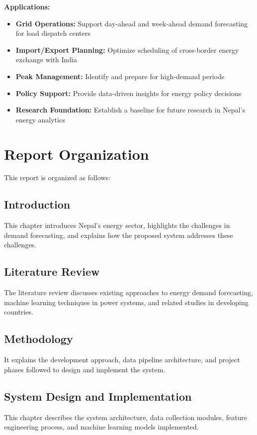         \textbf{Applications:}
        \begin{itemize}
            \item \textbf{Grid Operations:} Support day-ahead and week-ahead demand forecasting for load dispatch centers
            \item \textbf{Import/Export Planning:} Optimize scheduling of cross-border energy exchange with India
            \item \textbf{Peak Management:} Identify and prepare for high-demand periods
            \item \textbf{Policy Support:} Provide data-driven insights for energy policy decisions
            \item \textbf{Research Foundation:} Establish a baseline for future research in Nepal's energy analytics
        \end{itemize}

    \section{Report Organization}
        This report is organized as follows:

        \subsection{Introduction}
            This chapter introduces Nepal's energy sector, highlights the challenges in demand forecasting, and explains how the proposed system addresses these challenges.

        \subsection{Literature Review}
            The literature review discusses existing approaches to energy demand forecasting, machine learning techniques in power systems, and related studies in developing countries.

        \subsection{Methodology}
            It explains the development approach, data pipeline architecture, and project phases followed to design and implement the system.

        \subsection{System Design and Implementation}
            This chapter describes the system architecture, data collection modules, feature engineering process, and machine learning models implemented.

